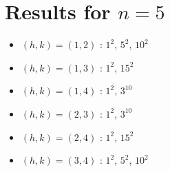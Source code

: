\section{Results for $n=5$}
\begin{itemize}
\item $(h,k)=(1,2)$ : $1^{2}$, $5^{2}$, $10^{2}$
\item $(h,k)=(1,3)$ : $1^{2}$, $15^{2}$
\item $(h,k)=(1,4)$ : $1^{2}$, $3^{10}$
\item $(h,k)=(2,3)$ : $1^{2}$, $3^{10}$
\item $(h,k)=(2,4)$ : $1^{2}$, $15^{2}$
\item $(h,k)=(3,4)$ : $1^{2}$, $5^{2}$, $10^{2}$
\end{itemize}
